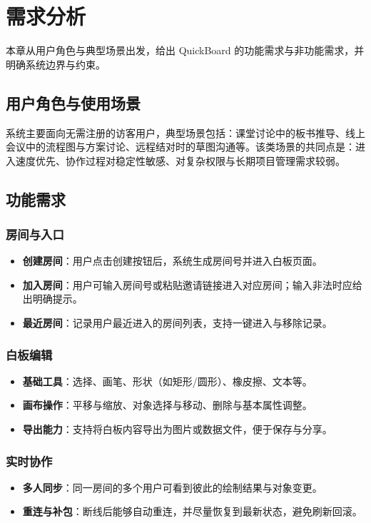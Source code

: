 \chapter{需求分析}\label{chap:req}

本章从用户角色与典型场景出发，给出 QuickBoard 的功能需求与非功能需求，并明确系统边界与约束。

\section{用户角色与使用场景}
系统主要面向无需注册的访客用户，典型场景包括：课堂讨论中的板书推导、线上会议中的流程图与方案讨论、远程结对时的草图沟通等。该类场景的共同点是：进入速度优先、协作过程对稳定性敏感、对复杂权限与长期项目管理需求较弱。

\section{功能需求}
\subsection{房间与入口}
\begin{itemize}
  \item \textbf{创建房间}：用户点击创建按钮后，系统生成房间号并进入白板页面。
  \item \textbf{加入房间}：用户可输入房间号或粘贴邀请链接进入对应房间；输入非法时应给出明确提示。
  \item \textbf{最近房间}：记录用户最近进入的房间列表，支持一键进入与移除记录。
\end{itemize}

\subsection{白板编辑}
\begin{itemize}
  \item \textbf{基础工具}：选择、画笔、形状（如矩形/圆形）、橡皮擦、文本等。
  \item \textbf{画布操作}：平移与缩放、对象选择与移动、删除与基本属性调整。
  \item \textbf{导出能力}：支持将白板内容导出为图片或数据文件，便于保存与分享。
\end{itemize}

\subsection{实时协作}
\begin{itemize}
  \item \textbf{多人同步}：同一房间的多个用户可看到彼此的绘制结果与对象变更。
  \item \textbf{重连与补包}：断线后能够自动重连，并尽量恢复到最新状态，避免刷新回滚。
\end{itemize}

